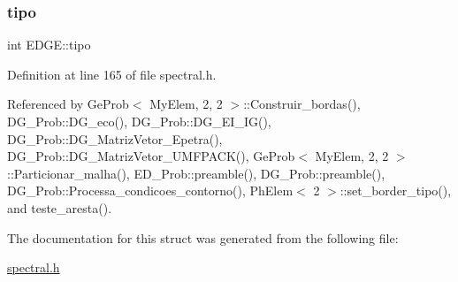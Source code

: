 \subsubsection{\texorpdfstring{tipo}{tipo}}
{\footnotesize\ttfamily int E\+D\+G\+E\+::tipo}



Definition at line 165 of file spectral.\+h.



Referenced by Ge\+Prob$<$ My\+Elem, 2, 2 $>$\+::\+Construir\+\_\+bordas(), D\+G\+\_\+\+Prob\+::\+D\+G\+\_\+eco(), D\+G\+\_\+\+Prob\+::\+D\+G\+\_\+\+E\+I\+\_\+\+I\+G(), D\+G\+\_\+\+Prob\+::\+D\+G\+\_\+\+Matriz\+Vetor\+\_\+\+Epetra(), D\+G\+\_\+\+Prob\+::\+D\+G\+\_\+\+Matriz\+Vetor\+\_\+\+U\+M\+F\+P\+A\+C\+K(), Ge\+Prob$<$ My\+Elem, 2, 2 $>$\+::\+Particionar\+\_\+malha(), E\+D\+\_\+\+Prob\+::preamble(), D\+G\+\_\+\+Prob\+::preamble(), D\+G\+\_\+\+Prob\+::\+Processa\+\_\+condicoes\+\_\+contorno(), Ph\+Elem$<$ 2 $>$\+::set\+\_\+border\+\_\+tipo(), and teste\+\_\+aresta().



The documentation for this struct was generated from the following file\+:\begin{DoxyCompactItemize}
\item 
\hyperlink{spectral_8h}{spectral.\+h}\end{DoxyCompactItemize}
